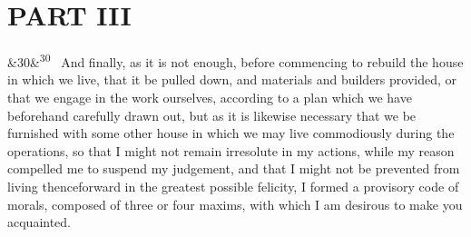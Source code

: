 \documentclass[12pt]{article}
\newcommand{\para}[1][]{\par\noindent\ifx&#1&\else\textsuperscript{\footnotesize #1}~\fi}
\begin{document}
\section*{PART III}

\para[30] And finally, as it is not enough, before commencing to rebuild the house in which we live, that it be pulled down, and materials and builders provided, or that we engage in the work ourselves, according to a plan which we have beforehand carefully drawn out, but as it is likewise necessary that we be furnished with some other house in which we may live commodiously during the operations, so that I might not remain irresolute in my actions, while my reason compelled me to suspend my judgement, and that I might not be prevented from living thenceforward in the greatest possible felicity, I formed a provisory code of morals, composed of three or four maxims, with which I am desirous to make you acquainted.
\end{document}
